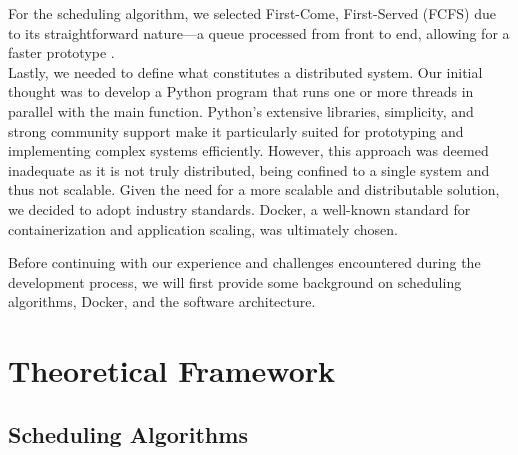 \documentclass{article}
\begin{document}
For the scheduling algorithm, we selected First-Come, First-Served (FCFS) due to its straightforward nature—a queue processed from front to end, allowing for a faster prototype \cite{Tyagi & Gupta, 2018}.\\

Lastly, we needed to define what constitutes a distributed system. Our initial thought was to develop a Python program that runs one or more threads in parallel with the main function. Python’s extensive libraries, simplicity, and strong community support make it particularly suited for prototyping and implementing complex systems efficiently. However, this approach was deemed inadequate as it is not truly distributed, being confined to a single system and thus not scalable. Given the need for a more scalable and distributable solution, we decided to adopt industry standards. Docker, a well-known standard for containerization and application scaling, was ultimately chosen.

Before continuing with our experience and challenges encountered during the development process, we will first provide some background on scheduling algorithms, Docker, and the software architecture.

\section{Theoretical Framework}
\subsection{Scheduling Algorithms}
\end{document}
